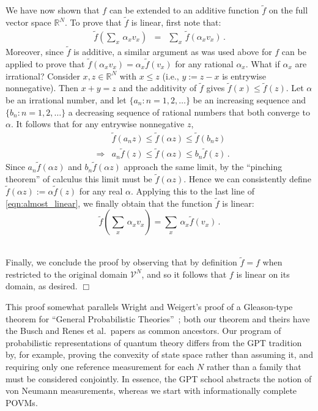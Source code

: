 \documentclass[%
 reprint,superscriptaddress,
 amsmath,amssymb,
 aps,pra, onecolumn, 12pt
]{revtex4-2}
\newcommand{\eqn}[1]{\begin{eqnarray} #1 \end{eqnarray}}
\newcommand{\zum}[2]{\displaystyle\sum_{#1}^{#2}}
\begin{document}
\begin{appendix}
We have now shown that $f$ can be extended to an additive function $\tilde{f}$ on the full vector space $\mathbb{R}^{N}$. To prove that $\tilde{f}$ is linear, first note that:
\eqn{ \label{eqn:almost_linear}
\tilde{f}\left( \zum{x}{}\, \alpha_x v_x \right) &=& \zum{x}{}\, \tilde{f}\left( \alpha_x v_x \right) \, .
}
Moreover, since $\tilde{f}$ is additive, a similar argument as was used above for $f$ can be applied to prove that $\tilde{f}(\alpha_x v_x) = \alpha_x \tilde{f}(v_x)$ for any rational $\alpha_x$. What if $\alpha_x$ are irrational? Consider $x,z \in \mathbb{R}^N$ with $x \leq z$ (i.e., $y := z - x$ is entrywise nonnegative). Then $x + y = z$ and the additivity of $\tilde{f}$ gives $\tilde{f}(x) \leq \tilde{f}(z)$. Let $\alpha$ be an irrational number, and let $\{a_n : n = 1,2,\dots \}$ be an increasing sequence and $\{b_n : n = 1,2,\dots \}$ a decreasing sequence of rational numbers that both converge to $\alpha$. It follows that for any entrywise nonnegative $z$,
\eqn{
&& \tilde{f}(a_n z) \leq \tilde{f}(\alpha z) \leq \tilde{f}(b_n z) \nonumber \\
&\Rightarrow& a_n \tilde{f}(z) \leq \tilde{f}(\alpha z) \leq b_n \tilde{f}(z) \, .
}
Since $a_n \tilde{f}(\alpha z)$ and $b_n \tilde{f}(\alpha z)$ approach the same limit, by the ``pinching theorem'' of calculus this limit must be $\tilde{f}(\alpha z)$. Hence we can consistently define $\tilde{f}(\alpha z) := \alpha \tilde{f}(z)$ for any real $\alpha$. Applying this to the last line of \eqref{eqn:almost_linear}, we finally obtain that the function $\tilde{f}$ is linear:
\begin{equation}
\tilde{f}\left( \sum_x \, \alpha_x v_x \right) = \sum_x \, \alpha_x \tilde{f}\left( v_x \right) \, .
\end{equation}

\ \\

Finally, we conclude the proof by observing that by definition $\tilde{f} = f$ when restricted to the original domain $\mathcal{V}^N$, and so it follows that $f$ is linear on its domain, as desired. $\Box$

\bigskip

This proof somewhat parallels Wright and Weigert's proof of a Gleason-type theorem for ``General Probabilistic Theories''~\cite{WRIGHT}; both our theorem and theirs have the Busch and Renes et al.\ papers as common ancestors. Our program of probabilistic representations of quantum theory differs from the GPT tradition by, for example, proving the convexity of state space rather than assuming it, and requiring only one reference measurement for each $N$ rather than a family that must be considered conjointly. In essence, the GPT school abstracts the notion of von Neumann measurements, whereas we start with informationally complete POVMs.

\end{appendix}
\end{document}
